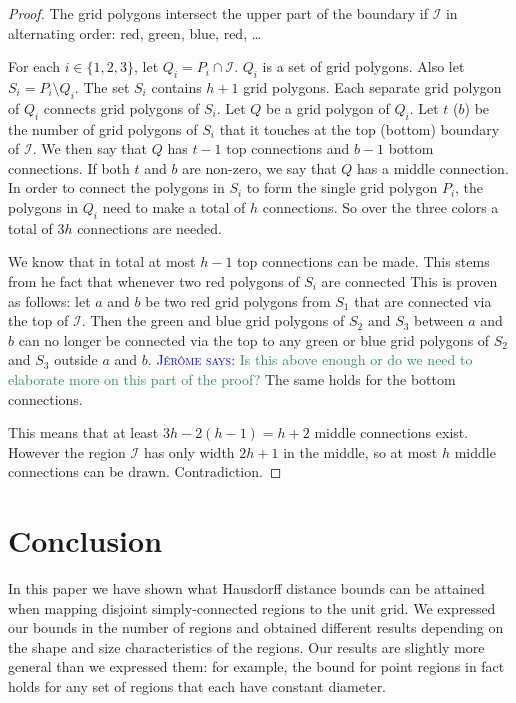 \documentclass[a4paper,UKenglish,cleveref]{lipics-v2019}
\newcommand{\mremark}[3]{\textcolor{blue}{\textsc{#1 #2:}} \textcolor{SeaGreen}{\textsf{#3}}}
\newcommand{\jerome}[2][says]{\mremark{J\'er\^ome}{#1}{#2}}
\newcommand{\ixi}{\mathcal{I}}
\begin{document}
\begin{proof}
The grid polygons intersect the upper part of the boundary if $\ixi$ in alternating order: red, green, blue, red, \dots

For each $i\in\{1, 2, 3\}$, let $Q_i=P_i\cap \ixi$.
$Q_i$ is a set of grid polygons.
Also let $S_i=P_i\setminus Q_i$.
The set $S_i$ contains $h+1$ grid polygons.
Each separate grid polygon of $Q_i$ connects grid polygons of $S_i$.
Let $Q$ be a grid polygon of $Q_i$. Let $t$ ($b$) be the number of grid polygons of $S_i$ that it touches at the top (bottom) boundary of $\ixi$. We then say that $Q$ has $t-1$ top connections and $b-1$ bottom connections.
If both $t$ and $b$ are non-zero, we say that $Q$ has a middle connection.
In order to connect the polygons in $S_i$ to form the single grid polygon $P_i$, the polygons in $Q_i$ need to make a total of $h$ connections.
So over the three colors a total of $3h$ connections are needed.

We know that in total at most $h-1$ top connections can be made. This stems from he fact that whenever two red polygons of $S_i$ are connected
This is proven as follows:
let $a$ and $b$ be two red grid polygons from $S_1$ that are connected via the top of $\ixi$. Then the green and blue grid polygons of $S_2$ and $S_3$ between $a$ and $b$ can no longer be connected via the top to any green or blue grid polygons of $S_2$ and $S_3$ outside $a$ and $b$.
\jerome{Is this above enough or do we need to elaborate more on this part of the proof?}
The same holds for the bottom connections.

This means that at least $3h- 2(h-1) = h+2$ middle connections exist. However the region $\ixi$ has only width $2h+1$ in the middle, so at most $h$ middle connections can be drawn.
Contradiction.

\end{proof}




\section{Conclusion} %
\label{sec:conclusion}

In this paper we have shown what Hausdorff distance bounds can be attained when mapping disjoint simply-connected regions to the unit grid. We expressed our bounds in the number of regions and obtained different results depending on the shape and size characteristics of the regions. Our results are slightly more general than we expressed them: for example, the bound for point regions in fact holds for any set of regions that each have constant diameter.
\end{document}
